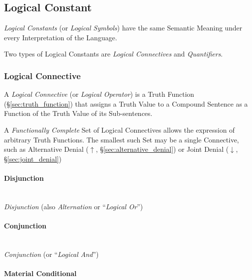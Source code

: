 \subsection{Logical Constant}\label{sec:logical_constant}

\emph{Logical Constants} (or \emph{Logical Symbols}) have the same
Semantic Meaning under every Interpretation of the Language.

Two types of Logical Constants are \emph{Logical Connectives} and
\emph{Quantifiers}.



\subsubsection{Logical Connective}\label{sec:logical_connective}

A \emph{Logical Connective} (or \emph{Logical Operator}) is a Truth
Function (\S\ref{sec:truth_function}) that assigns a Truth Value to a
Compound Sentence as a Function of the Truth Value of its
Sub-sentences.

A \emph{Functionally Complete} Set of Logical Connectives allows the
expression of arbitrary Truth Functions. The smallest such Set may be
a single Connective, such as Alternative Denial ($\uparrow$,
\S\ref{sec:alternative_denial}) or Joint Denial ($\downarrow$,
\S\ref{sec:joint_denial})



\paragraph{Disjunction}\label{sec:disjunction}\hfill \\

\emph{Disjunction} (also \emph{Alternation} or ``\emph{Logical Or}'')



\paragraph{Conjunction}\label{sec:conjunction}\hfill \\

\emph{Conjunction} (or ``\emph{Logical And}'')



\paragraph{Material Conditional}\label{sec:material_conditional}\hfill \\

